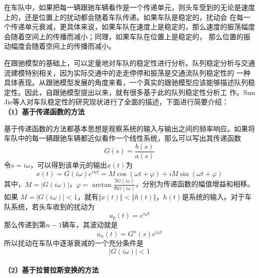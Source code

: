 在车队中，如果把每一辆跟驰车辆看作是一个传递单元，则头车受到的无论是速度上的，还是位置上的扰动都会随着车队传递。如果车队是稳定的，扰动会
在每一个传递单元衰减，更具体来说，如果车队在速度上是稳定的，那么速度的振荡幅度会随着空间上的传播而减小；同理，如果车队在位置上是稳定的，
那么位置的振动幅度会随着空间上的传播而减小。

在跟驰模型的基础上，可以定量地对车队的稳定性进行分析。队列稳定分析与交通流建模特别相关，因为实际交通中的走走停停和振荡是交通流队列稳定性的
一种具体表现。从跟驰模型发展的角度来看，一个真实的跟驰模型应该能够描述队列稳定性。因此，自跟驰模型提出以来，就有很多基于此的队列稳定性分析工
作。Sun Jie等人对车队稳定性的研究现状进行了全面的描述\cite{SUN2018212}，下面进行简要介绍： \\

\noindent \textbf{（1）基于传递函数的方法}

基于传递函数的方法都基本思想是观察系统的输入与输出之间的频率响应。如果将车队中的每一辆跟驰车辆都近似看作一个线性系统，那么可以写出其传递函数
\begin{equation}
  G(s) = \frac{b(s)}{a(s)}
  \label{eq:chap01-5}
\end{equation}
令$s=i\omega$，可以得到该单元的输出$x(t)$为
\begin{equation}
  x(t) = G(i\omega)e^{iwt} = M\cos(\omega t+\varphi) + iM\sin(\omega t+\varphi)
  \label{eq:chap01-6}
\end{equation}
其中，$M = |G(i\omega)|$，$\varphi = \arctan \frac{\Im G(i\omega)}{\Re G(i\omega)}$，分别为传递函数的幅值增益和相移。如果
$M = |G(i\omega)| < 1$，就有$\Vert x(t) \Vert < \Vert h(t) \Vert$，$h(t)$是系统的输入。对于车队系统，若头车收到的扰动为
\begin{equation}
  u_0(t) = e^{i\omega t}
  \label{eq:chap01-7}
\end{equation}
那么传递到第$n-1$辆车，其波动就是
\begin{equation}
  u_n(t) = G^n(s)e^{i\omega t}
  \label{eq:chap01-8}
\end{equation}
所以扰动在车队中逐渐衰减的一个充分条件是
\begin{equation}
  |G(i\omega)| < 1
  \label{eq:chap01-9}
\end{equation} \\

\noindent \textbf{（2）基于拉普拉斯变换的方法}

